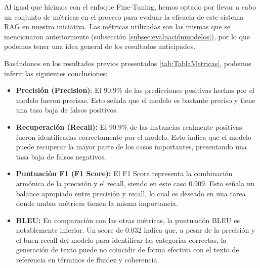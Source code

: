 \bigskip %

Al igual que hicimos con el enfoque Fine-Tuning, hemos optado por llevar a cabo un conjunto de métricas en el proceso para evaluar la eficacia de este sistema \acrshort{RAG} en nuestra iniciativa. Las métricas utilizadas son las mismas que se mencionaron anteriormente (subsección \ref{subsec:evaluaciónmodelos}), por lo que podemos tener una idea general de los resultados anticipados.

\bigskip %

\begin{table}[ht!]
  \centering
  \caption{Tabla resultados de métricas de GPT con RAG.}
  \label{tab:TablaMetricas}
\end{table}

\bigskip %

Basándonos en los resultados previos presentados \ref{tab:TablaMetricas}, podemos inferir las siguientes conclusiones:

\bigskip %

\begin{itemize}
    \item \textbf{Precisión (Precision)}: El 90.9\% de las predicciones positivas hechas por el modelo fueron precisas. Esto señala que el modelo es bastante preciso y tiene una tasa baja de falsos positivos.
    \item \textbf{Recuperación (Recall):} El 90.9\% de las instancias realmente positivas fueron identificadas correctamente por el modelo. Esto indica que el modelo puede recuperar la mayor parte de los casos importantes, presentando una tasa baja de falsos negativos.
    \item \textbf{Puntuación F1 (F1 Score):} El F1 Score representa la combinación armónica de la precisión y el recall, siendo en este caso 0.909. Esto señala un balance apropiado entre precisión y recall, lo cual es deseado en una tarea donde ambas métricas tienen la misma importancia.
    \item \textbf{\acrfull{BLEU}:} En comparación con las otras métricas, la puntuación BLEU es notablemente inferior. Un score de 0.032 indica que, a pesar de la precisión y el buen recall del modelo para identificar las categorías correctas, la generación de texto puede no coincidir de forma efectiva con el texto de referencia en términos de fluidez y coherencia.
\end{itemize}

